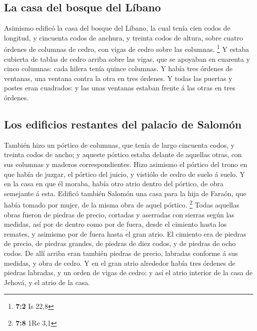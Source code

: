 \hypertarget{la-casa-del-bosque-del-luxedbano}{%
\subsection{La casa del bosque del
Líbano}\label{la-casa-del-bosque-del-luxedbano}}

 Asimismo edificó la casa del bosque del Líbano, la cual
tenía cien codos de longitud, y cincuenta codos de anchura, y treinta
codos de altura, sobre cuatro órdenes de columnas de cedro, con vigas de
cedro sobre las columnas. \footnote{\textbf{7:2} Is 22,8}  Y
estaba cubierta de tablas de cedro arriba sobre las vigas, que se
apoyaban en cuarenta y cinco columnas: cada hilera tenía quince
columnas.  Y había tres órdenes de ventanas, una ventana
contra la otra en tres órdenes.  Y todas las puertas y
postes eran cuadrados: y las unas ventanas estaban frente á las otras en
tres órdenes.

\hypertarget{los-edificios-restantes-del-palacio-de-salomuxf3n}{%
\subsection{Los edificios restantes del palacio de
Salomón}\label{los-edificios-restantes-del-palacio-de-salomuxf3n}}

 También hizo un pórtico de columnas, que tenía de largo
cincuenta codos, y treinta codos de ancho; y aqueste pórtico estaba
delante de aquellas otras, con sus columnas y maderos correspondientes.
 Hizo asimismo el pórtico del trono en que había de juzgar,
el pórtico del juicio, y vistiólo de cedro de suelo á suelo.
 Y en la casa en que él moraba, había otro atrio dentro del
pórtico, de obra semejante á esta. Edificó también Salomón una casa para
la hija de Faraón, que había tomado por mujer, de la misma obra de aquel
pórtico. \footnote{\textbf{7:8} 1Re 3,1}  Todas aquellas
obras fueron de piedras de precio, cortadas y aserradas con sierras
según las medidas, así por de dentro como por de fuera, desde el
cimiento hasta los remates, y asimismo por de fuera hasta el gran atrio.
 El cimiento era de piedras de precio, de piedras grandes,
de piedras de diez codos, y de piedras de ocho codos.  De
allí arriba eran también piedras de precio, labradas conforme á sus
medidas, y obra de cedro.  Y en el gran atrio alrededor
había tres órdenes de piedras labradas, y un orden de vigas de cedro: y
así el atrio interior de la casa de Jehová, y el atrio de la casa.

